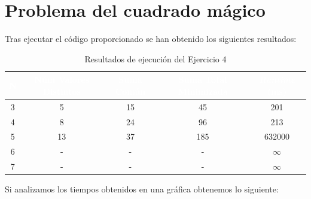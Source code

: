 \documentclass[11pt]{article}
\begin{document}
\section{Problema del cuadrado mágico}
Tras ejecutar el código proporcionado se han obtenido los siguientes resultados:
\begin{table}[H]
    \centering
    \begin{tabular}{| c | c | c | c | c |}
        \hline
        \rowcolor{maincolor}
        \textcolor{white}{\textbf{N}} & 
        \centering\arraybackslash\textcolor{white}{\textbf{Núm Valores Distintos}} & 
        \textcolor{white}{\textbf{Suma Común}} & 
        \textcolor{white}{\textbf{Suma Total Minimizada}} & 
        \textcolor{white}{\textbf{\textit{Runtime} (ms)}} \\
        \hline
        3 & 5 & 15 & 45 & 201 \\
        4 & 8 & 24 & 96 & 213 \\
        5 & 13 & 37 & 185 & 632000\\
        6 & - & - & - & $\infty$ \\
        7 & - & - & - & $\infty$ \\
        \hline
    \end{tabular}%
    \caption{Resultados de ejecución del Ejercicio 4}
    \label{tab:resultados_4} 
\end{table}

Si analizamos los tiempos obtenidos en una gráfica obtenemos lo siguiente:

\datatableC
\end{document}
